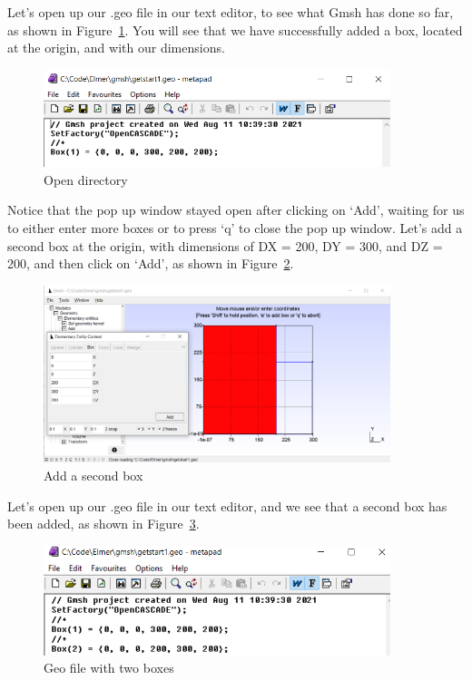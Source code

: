 \newpage

Let's open up our .geo file in our text editor, to see what Gmsh has done so far, as shown in Figure~\ref{fg:gmsh-12}.  You will see that we have successfully added a box, located at the origin, and with our dimensions.

\begin{figure}[H]
\centering
\includegraphics[width=0.9\textwidth]{gmsh-12}
\caption{Open directory}\label{fg:gmsh-12}
\end{figure}

Notice that the pop up window stayed open after clicking on `Add', waiting for us to either enter more boxes or to press `q' to close the pop up window.  Let's add a second box at the origin, with dimensions of DX = 200, DY = 300, and DZ = 200, and then click on `Add', as shown in Figure~\ref{fg:gmsh-13}.

\begin{figure}[H]
\centering
\includegraphics[width=0.9\textwidth]{gmsh-13}
\caption{Add a second box}\label{fg:gmsh-13}
\end{figure}

Let's open up our .geo file in our text editor, and we see that a second box has been added, as shown in Figure~\ref{fg:gmsh-14}.

\begin{figure}[H]
\centering
\includegraphics[width=0.9\textwidth]{gmsh-14}
\caption{Geo file with two boxes}\label{fg:gmsh-14}
\end{figure}

